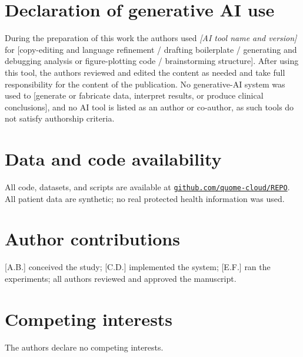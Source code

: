 \documentclass[11pt]{article}
\begin{document}
\section*{Declaration of generative AI use}
During the preparation of this work the authors used %
\emph{[AI tool name and version]} for %
[copy-editing and language refinement / drafting boilerplate / generating and
debugging analysis or figure-plotting code / brainstorming structure].
After using this tool, the authors reviewed and edited the content as needed and take
full responsibility for the content of the publication. No generative-AI system was
used to %
[generate or fabricate data, interpret results, or produce clinical conclusions], and
no AI tool is listed as an author or co-author, as such tools do not satisfy authorship
criteria.

\section*{Data and code availability}
All code, datasets, and scripts are available at
\href{https://github.com/quome-cloud/REPO}{\nolinkurl{github.com/quome-cloud/REPO}}.
All patient data are synthetic; no real protected health information was used.

\section*{Author contributions}
[A.B.] conceived the study; [C.D.] implemented the system; [E.F.] ran the experiments;
all authors reviewed and approved the manuscript.

\section*{Competing interests}
The authors declare no competing interests.
\end{document}
